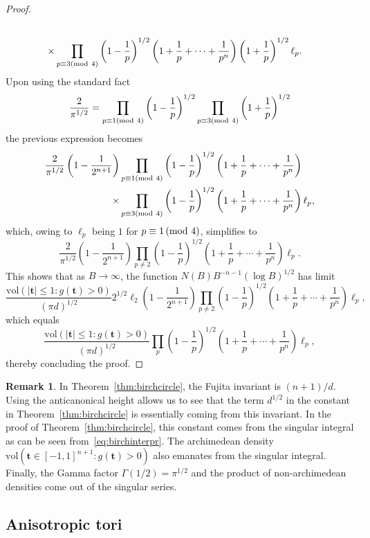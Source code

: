 \documentclass[a4paper,12pt,reqno]{amsart}
\numberwithin{equation}{section} \numberwithin{figure}{section}
\newcommand{\md}[1]{  \left(\textnormal{mod}\ #1\right)}
\renewcommand{\l}{\left}
\renewcommand{\r}{\right}
\renewcommand{\b}{\mathbf}
\renewcommand{\leq}{\leqslant}
\renewcommand{\#}{\sharp}
\theoremstyle{definition}
\newtheorem{remark}[lemma]{Remark}
\numberwithin{lemma}{section}
\begin{document}
\begin{proof}
\begin{align*}
\\\times
&\prod_{p\equiv 3 \md 4} 
 \l(1-\frac{1}{p}\r)^{1/2}  \l(1+\frac{1}{p}+\cdots+\frac{1}{p^n} \r) 
 \l(1+\frac{1}{p}\r)^{1/2}  \ell_p 
.
 \end{align*} Upon using the standard fact 
$$ \frac{2}{\pi^{1/2} } =  \prod_{p\equiv 1 \md 4 } \l(1-\frac{1}{p} \r)^{1/2}\prod_{p\equiv 3 \md 4 } \l(1+\frac{1}{p} \r) ^{1/2}
$$the previous expression becomes   \begin{align*}
\frac{2}{\pi^{1/2} } \l(1-\frac{1}{2^{n+1} }\r)
&\prod_{p\equiv 1 \md 4}  \l(1-\frac{1}{p}\r)^{1/2} \l(1+\frac{1}{p}+\cdots+\frac{1}{p^n} \r) 
\\
\times 
&\prod_{p\equiv 3 \md 4} 
 \l(1-\frac{1}{p}\r)^{1/2}  \l(1+\frac{1}{p}+\cdots+\frac{1}{p^n} \r) 
  \ell_p,
 \end{align*} 
which, owing to $\ell_p$ being $1$ for $p\equiv 1 \md 4 $, simplifies to $$ \frac{2}{\pi^{1/2} }
 \l(1-\frac{1}{2^{n+1} }\r)
\prod_{p\neq 2 }  \l(1-\frac{1}{p}\r)^{1/2} \l(1+\frac{1}{p}+\cdots+\frac{1}{p^n} \r) \ell_p .$$ 
This shows that as $B\to\infty$, the function $ N(B)B^{-n-1} (\log B)^{1/2}$ has limit 
$$
  \frac{ \textrm{vol}(|\b t|\leq 1  :g(\b t )> 0)}{(\pi d)^{1/2}}
 2^{1/2}   \ell_2 
 \l(1-\frac{1}{2^{n+1} }\r)
\prod_{p\neq 2 }  \l(1-\frac{1}{p}\r)^{1/2} \l(1+\frac{1}{p}+\cdots+\frac{1}{p^n} \r) \ell_p
,$$ which equals
$$
 \frac{ \textrm{vol}(|\b t|\leq 1  :g(\b t )> 0)}{(\pi d)^{1/2}} 
\prod_{p }  \l(1-\frac{1}{p}\r)^{1/2} \l(1+\frac{1}{p}+\cdots+\frac{1}{p^n} \r) \ell_p,$$ thereby concluding the proof.
 \end{proof}

 

 \begin{remark}
\label{rem:interpreta}
In  Theorem~\ref{thm:birchcircle}, the  Fujita invariant is  $(n+1)/d$.  Using the anticanonical height 
allows us to see that the term $ d^{1/2}$ in the constant in Theorem~\ref{thm:birchcircle}  is essentially coming from this invariant.
In the proof of  Theorem~\ref{thm:birchcircle}, this constant comes from the singular integral as can be seen from~\eqref{eq:birchinterpr}.
The archimedean density $ \textrm{vol}(\b t \in [-1,1]^{n+1}  :g(\b t )> 0)$ 
also emanates from the singular integral. Finally, the Gamma factor  $\Gamma(1/2)=\pi^{1/2}$ and the product of non-archimedean densities 
come out of the singular series. \end{remark}

\subsection{Anisotropic tori} \label{sec:tori}
\end{document}
